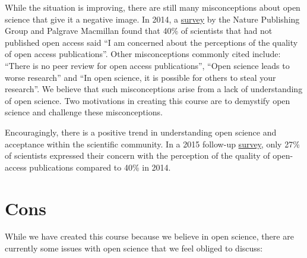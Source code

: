 \documentclass[
]{book}
\begin{document}
While the situation is improving, there are still many misconceptions about open science that give it a negative image. In 2014, a \href{https://group.springernature.com/gp/group/media/press-releases/archive-2015/perceptions-of-open-access-publishing-are-changing-for-the-bette/12000378}{survey} by the Nature Publishing Group and Palgrave Macmillan found that 40\% of scientists that had not published open access said ``I am concerned about the perceptions of the quality of open access publications''. Other misconceptions commonly cited include: ``There is no peer review for open access publications'', ``Open science leads to worse research'' and ``In open science, it is possible for others to steal your research''. We believe that such misconceptions arise from a lack of understanding of open science. Two motivations in creating this course are to demystify open science and challenge these misconceptions.

Encouragingly, there is a positive trend in understanding open science and acceptance within the scientific community. In a 2015 follow-up \href{https://group.springernature.com/gp/group/media/press-releases/archive-2015/perceptions-of-open-access-publishing-are-changing-for-the-bette/12000378}{survey}, only 27\% of scientists expressed their concern with the perception of the quality of open-access publications compared to 40\% in 2014.

\hypertarget{cons}{%
\section{Cons}\label{cons}}

While we have created this course because we believe in open science, there are currently some issues with open science that we feel obliged to discuss:
\end{document}
